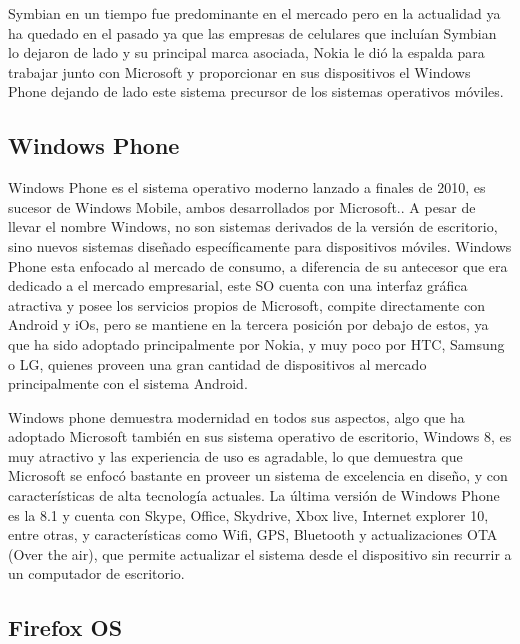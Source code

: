 Symbian en un tiempo fue predominante en el mercado pero en la actualidad ya ha quedado en el pasado ya que las empresas de celulares que incluían Symbian lo dejaron de lado y su 
principal marca asociada, Nokia le dió la espalda para trabajar junto con Microsoft y proporcionar en sus dispositivos el Windows Phone dejando de lado este sistema precursor de 
los sistemas operativos móviles.


\subsection*{Windows Phone}
Windows Phone es el sistema operativo moderno lanzado a finales de 2010, es sucesor de Windows Mobile, ambos desarrollados por Microsoft.. A pesar de llevar el nombre Windows, no 
son sistemas derivados de la versión de escritorio, sino nuevos sistemas diseñado específicamente para dispositivos móviles. Windows Phone esta enfocado al mercado de consumo, a 
diferencia de su antecesor que era dedicado a el mercado empresarial, este SO cuenta con una interfaz gráfica atractiva y posee los servicios propios de Microsoft, compite 
directamente con Android y iOs, pero se mantiene en la tercera posición por debajo de estos, ya que ha sido adoptado principalmente por Nokia, y muy poco por HTC, Samsung o LG, 
quienes proveen una gran cantidad de dispositivos al mercado principalmente con el sistema Android.

Windows phone demuestra modernidad en todos sus aspectos, algo que ha adoptado Microsoft también en sus sistema operativo de escritorio, Windows 8, es muy atractivo y las 
experiencia de uso es agradable, lo que demuestra que Microsoft se enfocó bastante en proveer un sistema de excelencia en diseño, y con características de alta tecnología 
actuales. La última versión de Windows Phone es la 8.1 y cuenta con Skype, Office, Skydrive, Xbox live, Internet explorer 10, entre otras, y características como Wifi, GPS, 
Bluetooth y actualizaciones OTA (Over the air), que permite actualizar el sistema desde el dispositivo sin recurrir a un computador de escritorio.


\subsection*{Firefox OS}
